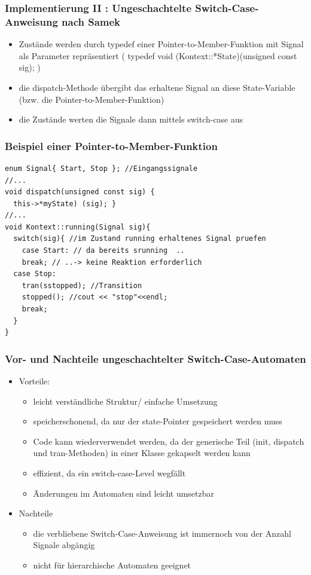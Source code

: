 \documentclass{beamer}
\begin{document}
\begin{frame}
  \frametitle{Implementierung II : Ungeschachtelte Switch-Case-Anweisung nach Samek}
  \begin{itemize}
    \item Zust\"ande werden durch typedef einer Pointer-to-Member-Funktion mit Signal als Parameter repr\"asentiert (  typedef void (Kontext::*State)(unsigned const sig);  )
    \item die dispatch-Methode \"ubergibt das erhaltene Signal an diese State-Variable (bzw. die Pointer-to-Member-Funktion) 
    \item die Zust\"ande werten die Signale dann mittels switch-case aus
  \end{itemize}
\end{frame}

\begin{frame}[fragile]
  \frametitle{Beispiel einer Pointer-to-Member-Funktion}
  \begin{lstlisting}
enum Signal{ Start, Stop }; //Eingangssignale
//...
void dispatch(unsigned const sig) {
  this->*myState) (sig); } 
//...
void Kontext::running(Signal sig){
  switch(sig){ //im Zustand running erhaltenes Signal pruefen
    case Start: // da bereits srunning  ..
    break; // ..-> keine Reaktion erforderlich
  case Stop:
    tran(sstopped); //Transition
    stopped(); //cout << "stop"<<endl;
    break;
  }
}  
  \end{lstlisting}
\end{frame}

\begin{frame}
  \frametitle{Vor- und Nachteile ungeschachtelter Switch-Case-Automaten}
  \begin{itemize}
    \item Vorteile:
    \begin{itemize}
      \item leicht verst\"andliche Struktur/ einfache Umsetzung
      \item speicherschonend, da nur der state-Pointer gespeichert werden muss
      \item Code kann wiederverwendet werden, da der generische Teil (init, dispatch und tran-Methoden) in einer Klasse gekapselt werden kann
      \item effizient, da ein switch-case-Level wegf\"allt
      \item \"Anderungen im Automaten sind leicht umsetzbar
    \end{itemize}
    \item Nachteile
    \begin{itemize}
      \item die verbliebene Switch-Case-Anweisung ist immernoch von der Anzahl Signale abg\"angig
      \item nicht f\"ur hierarchische Automaten geeignet
    \end{itemize}
  \end{itemize}
\end{frame}
\end{document}
